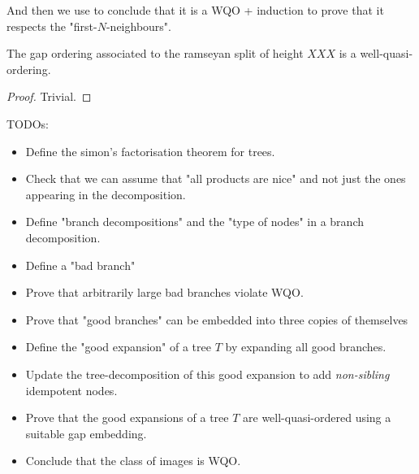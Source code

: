 And then we use \cite{LOPEZ23} to conclude that it is a WQO + induction 
to prove that it respects the "first-$N$-neighbours".
\begin{theorem}
    \label{good-generalized-gap:thm}
    The gap ordering associated to the ramseyan split of height $XXX$ is a well-quasi-ordering.
\end{theorem}
\begin{proof}
    Trivial. 
\end{proof}

TODOs:
\begin{itemize}
    \item Define the simon's factorisation theorem for trees.
    \item Check that we can assume that "all products are nice" and not just the ones
        appearing in the decomposition.
    \item Define "branch decompositions" and the "type of nodes" in a branch decomposition.
    \item Define a "bad branch"
    \item Prove that arbitrarily large bad branches violate WQO.
    \item Prove that "good branches" can be embedded into three copies of themselves
    \item Define the "good expansion" of a tree $T$ by expanding all good branches.
    \item Update the tree-decomposition of this good expansion to add \emph{non-sibling}
        idempotent nodes.
    \item Prove that the good expansions of a tree $T$ are well-quasi-ordered using a 
        suitable gap embedding.
    \item Conclude that the class of images is WQO.
\end{itemize}

